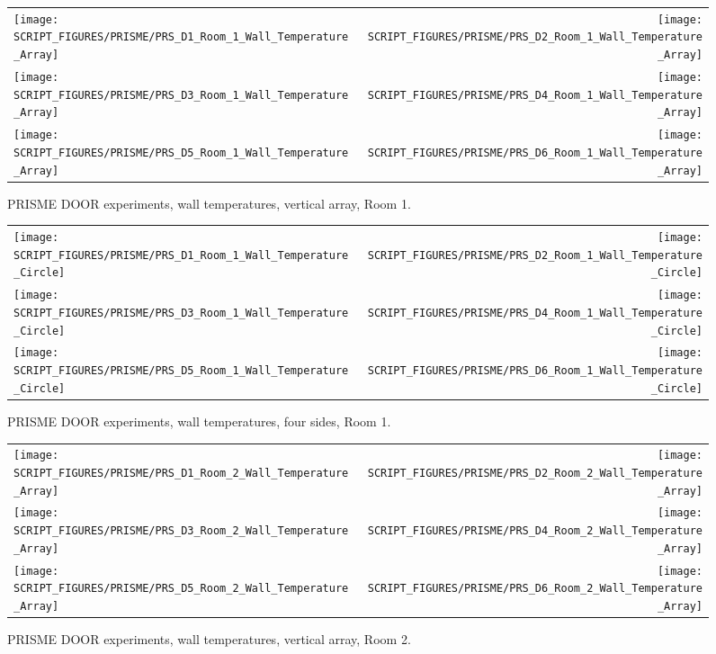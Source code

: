 \begin{figure}[!ht]
\begin{tabular*}{\textwidth}{l@{\extracolsep{\fill}}r}
\texttt{[image: SCRIPT\_FIGURES/PRISME/PRS\_D1\_Room\_1\_Wall\_Temperature\_Array]} &
\texttt{[image: SCRIPT\_FIGURES/PRISME/PRS\_D2\_Room\_1\_Wall\_Temperature\_Array]} \\
\texttt{[image: SCRIPT\_FIGURES/PRISME/PRS\_D3\_Room\_1\_Wall\_Temperature\_Array]} &
\texttt{[image: SCRIPT\_FIGURES/PRISME/PRS\_D4\_Room\_1\_Wall\_Temperature\_Array]} \\
\texttt{[image: SCRIPT\_FIGURES/PRISME/PRS\_D5\_Room\_1\_Wall\_Temperature\_Array]} &
\texttt{[image: SCRIPT\_FIGURES/PRISME/PRS\_D6\_Room\_1\_Wall\_Temperature\_Array]}
\end{tabular*}
\caption{PRISME DOOR experiments, wall temperatures, vertical array, Room 1.}
\label{PRISME_Wall_Array_Room_1}
\end{figure}

\newpage

\begin{figure}[p]
\begin{tabular*}{\textwidth}{l@{\extracolsep{\fill}}r}
\texttt{[image: SCRIPT\_FIGURES/PRISME/PRS\_D1\_Room\_1\_Wall\_Temperature\_Circle]} &
\texttt{[image: SCRIPT\_FIGURES/PRISME/PRS\_D2\_Room\_1\_Wall\_Temperature\_Circle]} \\
\texttt{[image: SCRIPT\_FIGURES/PRISME/PRS\_D3\_Room\_1\_Wall\_Temperature\_Circle]} &
\texttt{[image: SCRIPT\_FIGURES/PRISME/PRS\_D4\_Room\_1\_Wall\_Temperature\_Circle]} \\
\texttt{[image: SCRIPT\_FIGURES/PRISME/PRS\_D5\_Room\_1\_Wall\_Temperature\_Circle]} &
\texttt{[image: SCRIPT\_FIGURES/PRISME/PRS\_D6\_Room\_1\_Wall\_Temperature\_Circle]}
\end{tabular*}
\caption{PRISME DOOR experiments, wall temperatures, four sides, Room 1.}
\label{PRISME_Wall_Circle_Room_1}
\end{figure}

\begin{figure}[p]
\begin{tabular*}{\textwidth}{l@{\extracolsep{\fill}}r}
\texttt{[image: SCRIPT\_FIGURES/PRISME/PRS\_D1\_Room\_2\_Wall\_Temperature\_Array]} &
\texttt{[image: SCRIPT\_FIGURES/PRISME/PRS\_D2\_Room\_2\_Wall\_Temperature\_Array]} \\
\texttt{[image: SCRIPT\_FIGURES/PRISME/PRS\_D3\_Room\_2\_Wall\_Temperature\_Array]} &
\texttt{[image: SCRIPT\_FIGURES/PRISME/PRS\_D4\_Room\_2\_Wall\_Temperature\_Array]} \\
\texttt{[image: SCRIPT\_FIGURES/PRISME/PRS\_D5\_Room\_2\_Wall\_Temperature\_Array]} &
\texttt{[image: SCRIPT\_FIGURES/PRISME/PRS\_D6\_Room\_2\_Wall\_Temperature\_Array]}
\end{tabular*}
\caption{PRISME DOOR experiments, wall temperatures, vertical array, Room 2.}
\label{PRISME_Wall_Array_Room_2}
\end{figure}

